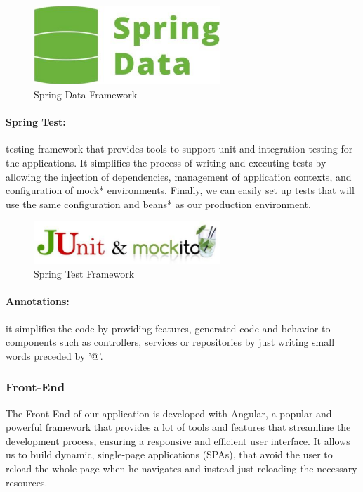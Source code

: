 \documentclass[12pt,a4paper,table,english]{article}
\begin{document}
	\begin{figure}[H]
	\centering
	\includegraphics[width=70mm]{Image/springdata}
	\caption{Spring Data Framework}
	\label{fig:Spring Data Framework}
	\end{figure}
	
	\paragraph{Spring Test:} testing framework that provides tools to support unit and integration testing for the applications. It simplifies the process of writing and executing tests by allowing the injection of dependencies, management of application contexts, and configuration of mock* environments. Finally, we can easily set up tests that will use the same configuration and beans* as our production environment.
	
		
	\begin{figure}[H]
		\centering
		\includegraphics[width=70mm]{Image/springtest}
		\caption{Spring Test Framework}
		\label{fig:Spring Test Framework}
	\end{figure}

	\paragraph{Annotations:} it simplifies the code by providing features, generated code and behavior to components such as controllers, services or repositories by just writing small words preceded by '@'.
	
	
	\subsubsection{Front-End}

	The Front-End of our application is developed with Angular, a popular and powerful framework that provides a lot of tools and features that streamline the development process, ensuring a responsive and efficient user interface. It allows us to build dynamic, single-page applications (SPAs), that avoid the user to reload the whole page when he navigates and instead just reloading the necessary resources.
	
\end{document}
